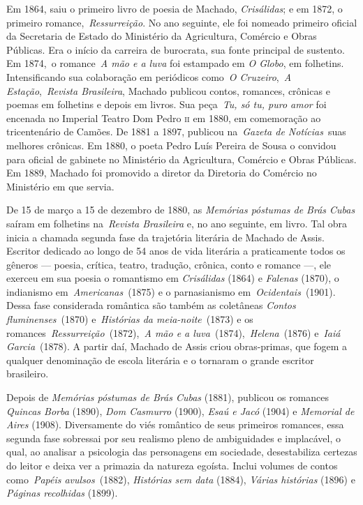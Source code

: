 Em 1864, saiu o primeiro livro de poesia de Machado, \emph{Crisálidas};
e em 1872, o primeiro romance,~\emph{Ressurreição}. No ano seguinte, ele
foi nomeado primeiro oficial da Secretaria de Estado do Ministério da
Agricultura, Comércio e Obras Públicas. Era o início da carreira de
burocrata, sua fonte principal de sustento. Em 1874,~o romance~\emph{A
mão e a luva} foi estampado em \emph{O Globo}, em folhetins.
Intensificando sua colaboração em periódicos como~\emph{O
Cruzeiro},~\emph{A Estação},~\emph{Revista Brasileira}, Machado publicou
contos, romances, crônicas e poemas em folhetins e depois em livros. Sua
peça~\emph{Tu, só tu, puro amor} foi encenada no Imperial Teatro Dom
Pedro \textsc{ii} em 1880, em comemoração ao tricentenário de Camões. De 1881 a
1897, publicou na~\emph{Gazeta de Notícias}~suas melhores crônicas. Em
1880, o poeta Pedro Luís Pereira de Sousa o convidou para oficial de
gabinete no Ministério da Agricultura, Comércio e Obras Públicas. Em
1889, Machado foi promovido a diretor da Diretoria do Comércio no
Ministério em que servia.

De 15 de março a 15 de dezembro de 1880, as \emph{Memórias póstumas de
Brás Cubas} saíram em folhetins na~\emph{Revista Brasileira} e, no ano
seguinte, em livro. Tal obra inicia a chamada segunda fase da trajetória
literária de Machado de Assis. Escritor dedicado ao longo de 54 anos de
vida literária a praticamente todos os gêneros --- poesia, crítica,
teatro, tradução, crônica, conto e romance ---, ele exerceu em sua poesia
o romantismo em \emph{Crisálidas} (1864) e \emph{Falenas} (1870), o
indianismo em~\emph{Americanas}~(1875) e o parnasianismo
em~\emph{Ocidentais}~(1901). Dessa fase considerada romântica são também
as coletâneas \emph{Contos fluminenses}~(1870) e~\emph{Histórias da
meia-noite}~(1873) e os romances~\emph{Ressurreição}~(1872),~\emph{A mão
e a luva}~(1874),~\emph{Helena}~(1876) e~\emph{Iaiá Garcia}~(1878). A
partir daí, Machado de Assis criou obras-primas, que fogem a qualquer
denominação de escola literária e o tornaram o grande escritor
brasileiro.

Depois de \emph{Memórias póstumas de Brás Cubas} (1881), publicou os
romances \emph{Quincas Borba} (1890), \emph{Dom Casmurro} (1900),
\emph{Esaú e Jacó} (1904) e \emph{Memorial de Aires} (1908).
Diversamente do viés romântico de seus primeiros romances, essa segunda
fase sobressai por seu realismo pleno de ambiguidades e implacável, o
qual, ao analisar a psicologia das personagens em sociedade,
desestabiliza certezas do leitor e deixa ver a primazia da natureza
egoísta. Inclui volumes de contos como~\emph{Papéis avulsos}~(1882),
\emph{Histórias sem data} (1884), \emph{Várias histórias} (1896) e
\emph{Páginas recolhidas} (1899).


